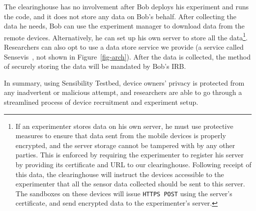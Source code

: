 The clearinghouse has no involvement after Bob deploys 
his experiment and runs the code, and it does not store any
data on Bob's behalf. After collecting the data he needs, Bob 
can use the experiment manager to download data from the remote devices. 
Alternatively, he can set up his own server to store all the data\footnote{\scriptsize
If an experimenter stores data on his own server, he must use protective
measures to ensure that data sent from the mobile devices is
properly encrypted, and the server storage cannot be tampered
with by any other parties. This is enforced by requiring the experimenter to register
his server by providing its certificate and URL to our
clearinghouse. Following receipt of this data, the clearinghouse will instruct the devices
accessible to the experimenter that all the sensor data collected should be
sent to this server. The sandboxes on these devices will issue
\texttt{HTTPS POST} using the server's certificate, and send encrypted
data to the experimenter's server.}. Researchers can also opt to use a data 
store service we provide (a service called Sensevis~\cite{sensevis}, 
not shown in Figure~\ref{fig-arch}). After the data is collected, the method of securely storing
the data will be mandated by Bob's IRB.

\smallskip
In summary, 
%
%
using Sensibility Testbed, device owners' privacy is protected
from any inadvertent or malicious attempt, and researchers 
are able to go through a streamlined process of device 
recruitment and experiment setup.

